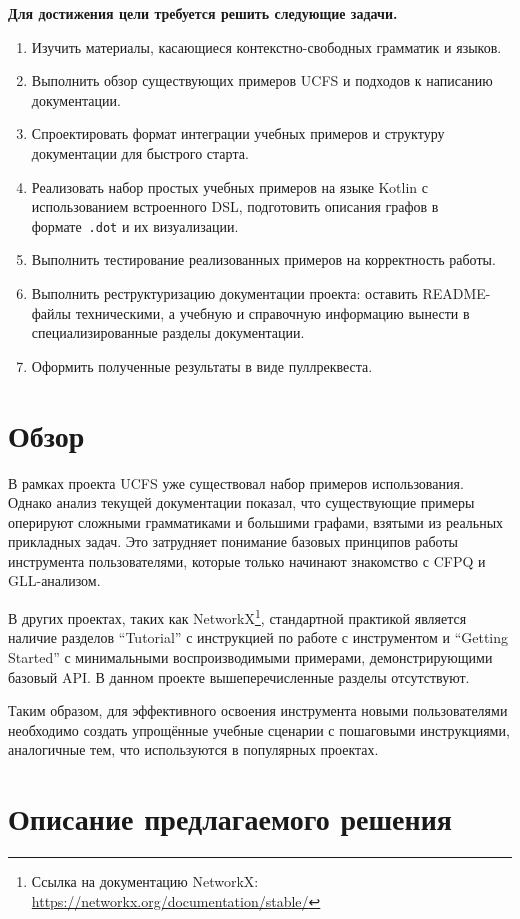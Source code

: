 \documentclass[a4paper]{article}
\begin{document}
\textbf{Для достижения цели требуется решить следующие задачи.}
\begin{enumerate}
    \item Изучить материалы, касающиеся контекстно-свободных грамматик и языков.
    \item Выполнить обзор существующих примеров UCFS и подходов к написанию документации.
    \item Спроектировать формат интеграции учебных примеров и структуру документации для быстрого старта.
    \item Реализовать набор простых учебных примеров на языке Kotlin с использованием встроенного DSL, подготовить описания графов в формате~\texttt{.dot} и их визуализации.
    \item Выполнить тестирование реализованных примеров на корректность работы.
    \item Выполнить реструктуризацию документации проекта: оставить README-файлы техническими, а учебную и справочную информацию вынести в специализированные разделы документации.
    \item Оформить полученные результаты в виде пуллреквеста.
\end{enumerate}

\section{Обзор}

В рамках проекта UCFS уже существовал набор примеров использования. Однако анализ текущей документации показал, что существующие примеры оперируют сложными грамматиками и большими графами, взятыми из реальных прикладных задач. Это затрудняет понимание базовых принципов работы инструмента пользователями, которые только начинают знакомство с CFPQ и GLL-анализом.

В других проектах, таких как NetworkX\footnote{Ссылка на документацию NetworkX: \url{https://networkx.org/documentation/stable/}}, стандартной практикой является наличие разделов \enquote{Tutorial} с инструкцией по работе с инструментом и \enquote{Getting Started} с минимальными воспроизводимыми примерами, демонстрирующими базовый API. В данном проекте вышеперечисленные разделы отсутствуют.

Таким образом, для эффективного освоения инструмента новыми пользователями необходимо создать упрощённые учебные сценарии с пошаговыми инструкциями, аналогичные тем, что используются в популярных проектах.

\section{Описание предлагаемого решения}
\end{document}
